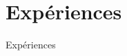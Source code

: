 \section{Expériences}
  \begin{frame}[allowframebreaks]{Expériences}
    \framesubtitle{}
  \end{frame}

